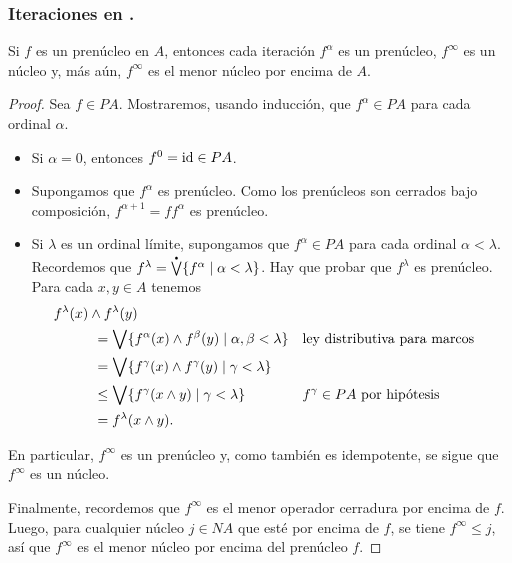 \subsubsection{Iteraciones en .}

\begin{lemma}
  Si $f$ es un prenúcleo en $A$, entonces cada iteración
  $f^\alpha$ es un prenúcleo, $f^\infty$ es un núcleo y, más aún,
  $f^\infty$ es el menor núcleo por encima de $A$.
\end{lemma}
\begin{proof}
  Sea $f\in PA$.
  Mostraremos, usando inducción, que $f^\alpha\in PA$ para cada
  ordinal $\alpha$.
  \begin{itemize}
    \item Si $\alpha=0$, entonces $f^0=\mathrm{id}\in PA$.
    \item Supongamos que $f^\alpha$ es prenúcleo.
    Como los prenúcleos son cerrados bajo composición,
    $f^{\alpha+1}=ff^\alpha$ es prenúcleo.
    \item Si $\lambda$ es un ordinal límite, supongamos que
    $f^\alpha\in PA$ para cada ordinal $\alpha<\lambda$.
    Recordemos que
    $f^\lambda=\pSup\{f^\alpha\mid\alpha<\lambda\}$.
    Hay que probar que $f^\lambda$ es prenúcleo.
    Para cada $x,y\in A$ tenemos
    \begin{align*}
      &f^\lambda(x) \inf f^\lambda(y) \\
      &\hspace{10mm}
      = \Sup\{f^\alpha(x) \inf f^\beta(y) \mid
        \alpha,\beta<\lambda\}
        && \text{ley distributiva para marcos} \\
      &\hspace{10mm}
      = \Sup\{f^\gamma(x)\inf f^\gamma(y)
        \mid \gamma<\lambda\} \\
      &\hspace{10mm}
      \leq \Sup\{f^\gamma(x\inf y) \mid \gamma<\lambda\}
        && f^\gamma\in PA \text{ por hipótesis}\\
      &\hspace{10mm}
      = f^\lambda(x\inf y).
    \end{align*}
  \end{itemize}
  En particular, $f^\infty$ es un prenúcleo y, como también es
  idempotente, se sigue que $f^\infty$ es un núcleo.

  Finalmente, recordemos que $f^\infty$ es el menor operador
  cerradura por encima de $f$.
  Luego, para cualquier núcleo $j\in NA$ que esté por encima de
  $f$, se tiene $f^\infty\leq j$, así que $f^\infty$ es el menor
  núcleo por encima del prenúcleo $f$.
\end{proof}

